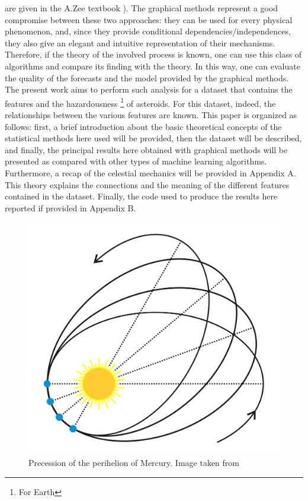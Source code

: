 \documentclass[12pt,%
               a4paper,%
               oneside,openany,%
               titlepage,%
               headinclude,footinclude,%
               BCOR5mm,%
               cleardoublepage=empty,%
               tablecaptionabove,%
               floatperchapter,
               ]{scrreprt}                 %
\begin{document}
are given in the A.Zee textbook \cite{zee2013einstein}). The graphical methods represent a good compromise between these two approaches: they can be used for every physical phenomenon, and, since they provide conditional dependencies/independences, they also give an elegant and intuitive representation of their mechanisms. Therefore, if the theory of the involved process is known, one can use this class of algorithms and compare its finding with the theory. In this way, one can evaluate the quality of the forecasts and the model provided by the graphical methods. The present work aims to perform such analysis for a dataset that contains the features and the hazardousness \footnote{For Earth} of asteroids. For this dataset, indeed, the relationships between the various features are known. This paper is organized as follows: first, a brief introduction about the basic theoretical concepts of the statistical methods here used will be provided, then the dataset will be described, and finally, the principal results here obtained with graphical methods will be presented as compared with other types of machine learning algorithms. Furthermore, a recap of the celestial mechanics will be provided in Appendix A. This theory explains the connections and the meaning of the different features contained in the dataset. Finally, the code used to produce the results here reported if provided in Appendix B.




\begin{figure}[h]
\begin{center}
\includegraphics[width=1\textwidth]{Figures/Perihelion_precession2.png}
\caption{Precession of the perihelion of Mercury. Image taken from \cite{Perihelion_precession}}
\label{Perihelion_precession2}
\end{center}
\end{figure}
\end{document}
